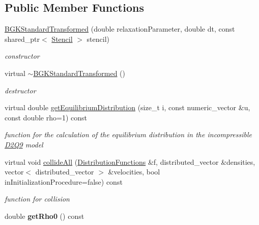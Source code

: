 \subsection*{Public Member Functions}
\begin{DoxyCompactItemize}
\item 
\hypertarget{classnatrium_1_1BGKStandardTransformed_a6eb65cf04592c98483b0e7e533c342c7}{
\hyperlink{classnatrium_1_1BGKStandardTransformed_a6eb65cf04592c98483b0e7e533c342c7}{BGKStandardTransformed} (double relaxationParameter, double dt, const shared\_\-ptr$<$ \hyperlink{classnatrium_1_1Stencil}{Stencil} $>$ stencil)}
\label{classnatrium_1_1BGKStandardTransformed_a6eb65cf04592c98483b0e7e533c342c7}

\begin{DoxyCompactList}\small\item\em constructor \item\end{DoxyCompactList}\item 
virtual \hyperlink{classnatrium_1_1BGKStandardTransformed_a07dc7f5ccaf1abaa725a7b62a2b79ac4}{$\sim$BGKStandardTransformed} ()
\begin{DoxyCompactList}\small\item\em destructor \item\end{DoxyCompactList}\item 
virtual double \hyperlink{classnatrium_1_1BGKStandardTransformed_a870465cc026f92c8ffba899af6f95634}{getEquilibriumDistribution} (size\_\-t i, const numeric\_\-vector \&u, const double rho=1) const 
\begin{DoxyCompactList}\small\item\em function for the calculation of the equilibrium distribution in the incompressible \hyperlink{classnatrium_1_1D2Q9}{D2Q9} model \item\end{DoxyCompactList}\item 
virtual void \hyperlink{classnatrium_1_1BGKStandardTransformed_a00c806c32f16e518117c818a29c2fef4}{collideAll} (\hyperlink{classnatrium_1_1DistributionFunctions}{DistributionFunctions} \&f, distributed\_\-vector \&densities, vector$<$ distributed\_\-vector $>$ \&velocities, bool inInitializationProcedure=false) const 
\begin{DoxyCompactList}\small\item\em function for collision \item\end{DoxyCompactList}\item 
\hypertarget{classnatrium_1_1BGKStandardTransformed_a883401ad796f196bcc47456b31159eae}{
double {\bfseries getRho0} () const }
\label{classnatrium_1_1BGKStandardTransformed_a883401ad796f196bcc47456b31159eae}


\end{DoxyCompactItemize}
